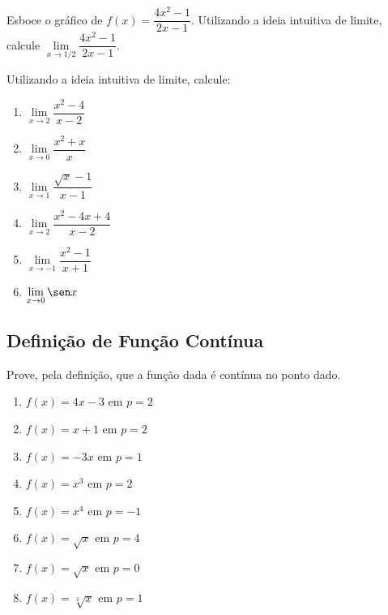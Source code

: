 \begin{exercicio}[3]
Esboce o gráfico de $f(x) = \dfrac{4x^2 - 1}{2x - 1}$. Utilizando a ideia intuitiva de limite, calcule $\lim\limits_{x \to 1/2} \dfrac{4x^2 - 1}{2x - 1}$.
\end{exercicio}

\begin{exercicio}[4]
Utilizando a ideia intuitiva de limite, calcule:
\begin{enumerate}[label=\alph*)]
    \item $\lim\limits_{x \to 2} \dfrac{x^2 - 4}{x - 2}$
    \item $\lim\limits_{x \to 0} \dfrac{x^2 + x}{x}$
    \item $\lim\limits_{x \to 1} \dfrac{\sqrt{x} - 1}{x - 1}$
    \item $\lim\limits_{x \to 2} \dfrac{x^2 - 4x + 4}{x - 2}$
    \item $\lim\limits_{x \to -1} \dfrac{x^2 - 1}{x + 1}$
    \item $\lim\limits_{x \to 0} \sen x$
\end{enumerate}
\end{exercicio}

\clearpage

\subsection{Definição de Função Contínua}

\begin{exercicio}[1]
Prove, pela definição, que a função dada é contínua no ponto dado.
\begin{enumerate}[label=\alph*)]
    \item $f(x) = 4x - 3$ em $p = 2$
    \item $f(x) = x + 1$ em $p = 2$
    \item $f(x) = -3x$ em $p = 1$
    \item $f(x) = x^3$ em $p = 2$
    \item $f(x) = x^4$ em $p = -1$
    \item $f(x) = \sqrt{x}$ em $p = 4$
    \item $f(x) = \sqrt{x}$ em $p = 0$
    \item $f(x) = \sqrt[3]{x}$ em $p = 1$
\end{enumerate}
\end{exercicio}

